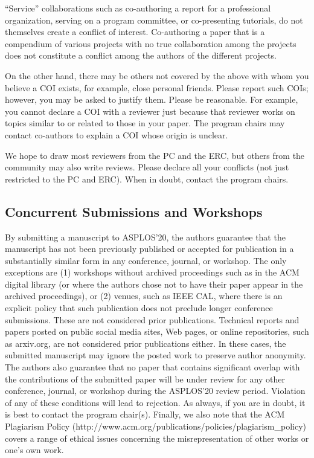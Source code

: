 \documentclass[pageno]{jpaper}
\begin{document}
``Service'' collaborations such as co-authoring a report for a professional
organization, serving on a program committee, or co-presenting
tutorials, do not themselves create a conflict of interest.
Co-authoring a paper that is a compendium of various projects with
no true collaboration among the projects does not constitute a
conflict among the authors of the different projects.

On the other hand, there may be others not covered by the above	with whom
you believe a COI exists, for example, close personal friends.
Please report such COIs; however, you may be asked to justify them.
Please be reasonable.	For example, you cannot declare a COI with a
reviewer just because that reviewer works on topics similar to or
related to those in your paper.
The program chairs may contact co-authors to explain a COI whose origin is unclear.

We hope to draw most reviewers from the PC and the ERC, but others from the
community may also write reviews.  Please declare all your conflicts (not
just restricted to the PC and ERC).  When in doubt, contact the program
chairs.

\subsection{Concurrent Submissions and Workshops}

By submitting a manuscript to ASPLOS'20, the authors guarantee that the
manuscript has not been previously published or accepted for publication in
a substantially similar form in any conference, journal, or workshop. The
only exceptions are (1) workshops without archived proceedings such as in
the ACM digital library (or where the authors chose not to have their paper
appear in the archived proceedings), or (2) venues, such as IEEE CAL, where
there is an explicit policy that such publication does not preclude longer
conference submissions. These are not considered prior publications. 
Technical reports and papers posted on public social media sites, Web pages,
or online repositories, such as arxiv.org, are not considered prior
publications either. In these cases, the submitted manuscript may
ignore the posted work to preserve author anonymity. 
The authors also guarantee that no paper that contains
significant overlap with the contributions of the submitted paper will be
under review for any other conference, journal, or workshop during the
ASPLOS'20 review period. Violation of any of these conditions will lead to
rejection.  As always, if you are in doubt, it is best to contact the
program chair(s).  Finally, we also note that the ACM Plagiarism Policy
(http://www.acm.org/publications/policies/plagiarism\_policy) covers a range
of ethical issues concerning the misrepresentation of other works or one's
own work.
\end{document}
